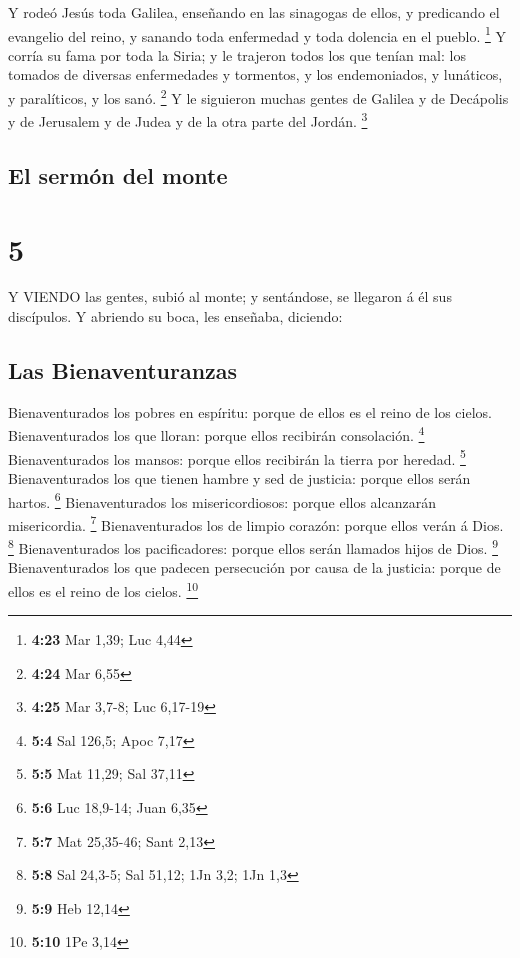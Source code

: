  Y rodeó Jesús toda Galilea, enseñando en las sinagogas de
ellos, y predicando el evangelio del reino, y sanando toda enfermedad y
toda dolencia en el pueblo. \footnote{\textbf{4:23} Mar 1,39; Luc 4,44}
 Y corría su fama por toda la Siria; y le trajeron todos
los que tenían mal: los tomados de diversas enfermedades y tormentos, y
los endemoniados, y lunáticos, y paralíticos, y los sanó. \footnote{\textbf{4:24}
  Mar 6,55}  Y le siguieron muchas gentes de Galilea y de
Decápolis y de Jerusalem y de Judea y de la otra parte del Jordán.
\footnote{\textbf{4:25} Mar 3,7-8; Luc 6,17-19}

\hypertarget{el-sermuxf3n-del-monte}{%
\subsection{El sermón del monte}\label{el-sermuxf3n-del-monte}}

\hypertarget{section-4}{%
\section{5}\label{section-4}}

 Y VIENDO las gentes, subió al monte; y sentándose, se
llegaron á él sus discípulos.  Y abriendo su boca, les
enseñaba, diciendo:

\hypertarget{las-bienaventuranzas}{%
\subsection{Las Bienaventuranzas}\label{las-bienaventuranzas}}

 Bienaventurados los pobres en espíritu: porque de ellos es
el reino de los cielos.  Bienaventurados los que lloran:
porque ellos recibirán consolación. \footnote{\textbf{5:4} Sal 126,5;
  Apoc 7,17}  Bienaventurados los mansos: porque ellos
recibirán la tierra por heredad. \footnote{\textbf{5:5} Mat 11,29; Sal
  37,11}  Bienaventurados los que tienen hambre y sed de
justicia: porque ellos serán hartos. \footnote{\textbf{5:6} Luc 18,9-14;
  Juan 6,35}  Bienaventurados los misericordiosos: porque
ellos alcanzarán misericordia. \footnote{\textbf{5:7} Mat 25,35-46; Sant
  2,13}  Bienaventurados los de limpio corazón: porque ellos
verán á Dios. \footnote{\textbf{5:8} Sal 24,3-5; Sal 51,12; 1Jn 3,2; 1Jn
  1,3}  Bienaventurados los pacificadores: porque ellos
serán llamados hijos de Dios. \footnote{\textbf{5:9} Heb 12,14}
 Bienaventurados los que padecen persecución por causa de
la justicia: porque de ellos es el reino de los cielos. \footnote{\textbf{5:10}
  1Pe 3,14}


